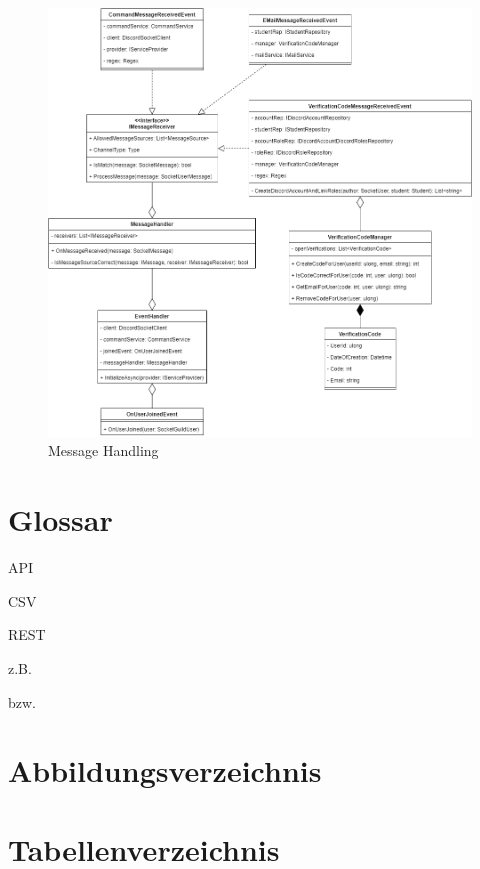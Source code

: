 \documentclass[a4paper, table]{article}
\begin{document}
\begin{figure}[ht]
    \centering
    \hspace*{-2cm}
    \includegraphics[width=1.3\textwidth]{img/MessageHandling.png}
    \caption{Message Handling}
    \label{fig:message-handling}
\end{figure}
\clearpage

\newpage
\section{Glossar}

API

CSV

REST

z.B.

bzw.


\section{Abbildungsverzeichnis}
\listoffigures

\section{Tabellenverzeichnis}
\listoftables
\end{document}
